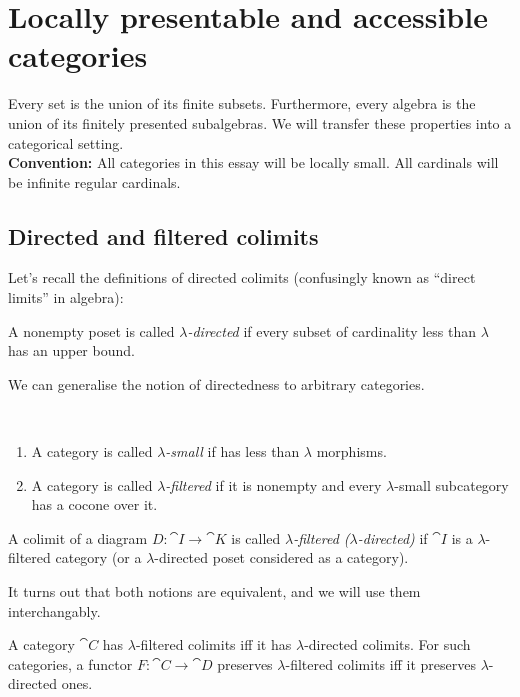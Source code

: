 \section{Locally presentable and accessible categories}
\label{sec:presentableaccessible}


Every set is the union of its finite subsets. Furthermore, every algebra is the union of its finitely presented subalgebras. We will transfer these properties into a categorical setting. \\

\textbf{Convention: } All categories in this essay will be locally small. All cardinals will be infinite regular cardinals.

\subsection{Directed and filtered colimits}

Let's recall the definitions of directed colimits (confusingly known as ``direct limits'' in algebra):
\begin{Definition}
A nonempty poset is called \emph{$\lambda$-directed} if every subset of cardinality less than $\lambda$ has an upper bound.
\end{Definition}

We can generalise the notion of directedness to arbitrary categories.

\begin{Definition}\
\begin{enumerate}
\item A category is called \emph{$\lambda$-small} if has less than $\lambda$ morphisms.
\item A category is called \emph{$\lambda$-filtered} if it is nonempty and every $\lambda$-small subcategory has a cocone over it. 
\end{enumerate}
A colimit of a diagram $D : \cat I \to \cat K$ is called \emph{$\lambda$-filtered ($\lambda$-directed)} if $\cat I$ is a $\lambda$-filtered category (or a $\lambda$-directed poset considered as a category). 
\end{Definition}

It turns out that both notions are equivalent, and we will use them interchangably.

\begin{Proposition}A category $\cat C$ has $\lambda$-filtered colimits iff it has $\lambda$-directed colimits. For such categories, a functor $F : \cat C \to \cat D$ preserves $\lambda$-filtered colimits iff it preserves $\lambda$-directed ones.
\end{Proposition}

